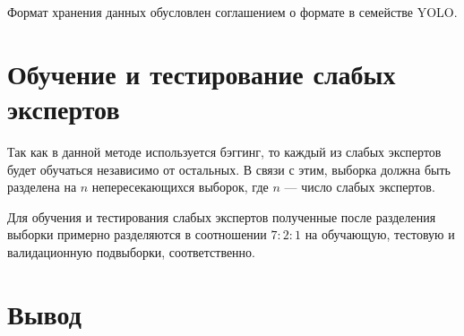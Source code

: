 Формат хранения данных обусловлен соглашением о формате в семействе YOLO.

\section{Обучение и тестирование слабых экспертов}

Так как в данной методе используется бэггинг, то каждый из слабых экспертов будет обучаться независимо от остальных. В связи с этим, выборка должна быть разделена на $n$ непересекающихся выборок, где $n$ --- число слабых экспертов.

Для обучения и тестирования слабых экспертов полученные после разделения выборки примерно разделяются в соотношении $7:2:1$ на обучающую, тестовую и валидационную подвыборки, соответственно.

\section{Вывод}